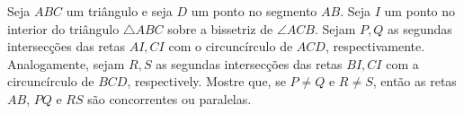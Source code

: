 Seja $ABC$ um triângulo e seja $D$ um ponto no segmento $AB$. Seja $I$ um ponto no interior do triângulo $\triangle ABC$ sobre a bissetriz de $\angle ACB$. Sejam $P, Q$ as segundas intersecções das retas $AI, CI$ com o circuncírculo de $ACD$, respectivamente. Analogamente, sejam $R, S$ as segundas intersecções das retas $BI, CI$ com a circuncírculo de $BCD$, respectively. Mostre que, se $P\neq Q$ e $R\neq S$, então as retas $AB$, $PQ$ e $RS$ são concorrentes ou paralelas.
